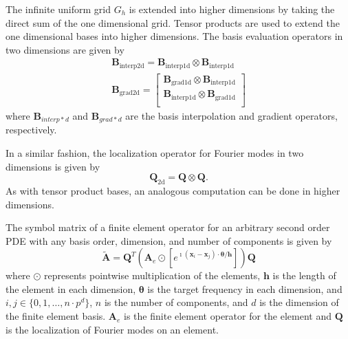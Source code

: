 \documentclass[review]{siamart190516}
\begin{document}
The infinite uniform grid $G_h$ is extended into higher dimensions by taking the direct sum of the one dimensional grid.
Tensor products are used to extend the one dimensional bases into higher dimensions.
The basis evaluation operators in two dimensions are given by
\begin{equation}
\begin{split}
\mathbf{B}_{\text{interp2d}} = \mathbf{B}_{\text{interp1d}} \otimes \mathbf{B}_{\text{interp1d}} \\
\mathbf{B}_{\text{grad2d}} =
\begin{bmatrix}
    \mathbf{B}_{\text{grad1d}} \otimes \mathbf{B}_{\text{interp1d}} \\
    \mathbf{B}_{\text{interp1d}} \otimes \mathbf{B}_{\text{grad1d}} \\
\end{bmatrix}
\end{split}
\end{equation}
where $\mathbf{B}_{interp*d}$ and $\mathbf{B}_{grad*d}$ are the basis interpolation and gradient operators, respectively.

In a similar fashion, the localization operator for Fourier modes in two dimensions is given by
\begin{equation}
\mathbf{Q}_{\text{2d}} = \mathbf{Q} \otimes \mathbf{Q}.
\end{equation}
As with tensor product bases, an analogous computation can be done in higher dimensions.

\begin{definition}
The symbol matrix of a finite element operator for an arbitrary second order PDE with any basis order, dimension, and number of components is given by
\begin{equation}\label{symbolhighorder}
\tilde{\mathbf{A}} = \mathbf{Q}^T \left( \mathbf{A}_e \odot \left[ e^{\imath \left( \mathbf{x}_i - \mathbf{x}_j \right) \cdot \boldsymbol{\theta} / \mathbf{h}} \right] \right) \mathbf{Q}
\end{equation}
where $\odot$ represents pointwise multiplication of the elements, $\mathbf{h}$ is the length of the element in each dimension, $\boldsymbol{\theta}$ is the target frequency in each dimension, and $i, j \in \lbrace 0, 1, \dots, n \cdot p^d \rbrace$, $n$ is the number of components, and $d$ is the dimension of the finite element basis.
$\mathbf{A}_e$ is the finite element operator for the element and $\mathbf{Q}$ is the localization of Fourier modes on an element.
\end{definition}\label{def:high_order_symbol}
\end{document}

